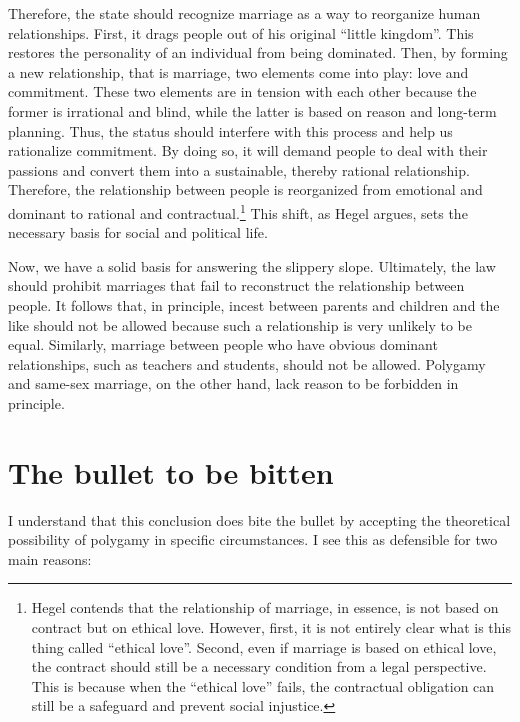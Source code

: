 \documentclass[man,floatsintext]{apa7}
\begin{document}
Therefore, the state should recognize marriage as a way to reorganize human relationships. First, it drags people out of his original ``little kingdom''. This restores the personality of an individual from being dominated. Then, by forming a new relationship, that is marriage, two elements come into play: love and commitment. These two elements are in tension with each other because the former is irrational and blind, while the latter is based on reason and long-term planning. Thus, the status should interfere with this process and help us rationalize commitment. By doing so, it will demand people to deal with their passions and convert them into a sustainable, thereby rational relationship. Therefore, the relationship between people is reorganized from emotional and dominant to rational and contractual.\footnote{Hegel contends that the relationship of marriage, in essence, is not based on contract but on ethical love. However, first, it is not entirely clear what is this thing called ``ethical love''. Second, even if marriage is based on ethical love, the contract should still be a necessary condition from a legal perspective. This is because when the ``ethical love'' fails, the contractual obligation can still be a safeguard and prevent social injustice.} This shift, as Hegel argues, sets the necessary basis for social and political life.

Now, we have a solid basis for answering the slippery slope. Ultimately, the law should prohibit marriages that fail to reconstruct the relationship between people. It follows that, in principle, incest between parents and children and the like should not be allowed because such a relationship is very unlikely to be equal. Similarly, marriage between people who have obvious dominant relationships, such as teachers and students, should not be allowed. Polygamy and same-sex marriage, on the other hand, lack reason to be forbidden in principle. 

\section{The bullet to be bitten}

I understand that this conclusion does bite the bullet by accepting the theoretical possibility of polygamy in specific circumstances. I see this as defensible for two main reasons:
\end{document}
